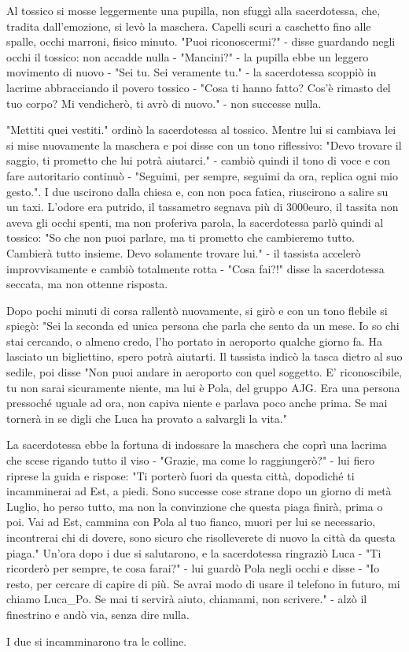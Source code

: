 Al tossico si mosse leggermente una pupilla, non sfuggì alla sacerdotessa, che, tradita dall'emozione, si levò la maschera. Capelli scuri a caschetto fino alle spalle, occhi marroni, fisico minuto.
"Puoi riconoscermi?" - disse guardando negli occhi il tossico: non accadde nulla - "Mancini?" - la pupilla ebbe un leggero movimento di nuovo - "Sei tu. Sei veramente tu." - la sacerdotessa scoppiò in lacrime abbracciando il povero tossico - "Cosa ti hanno fatto? Cos'è rimasto del tuo corpo? Mi vendicherò, ti avrò di nuovo." - non successe nulla.

"Mettiti quei vestiti." ordinò la sacerdotessa al tossico. Mentre lui si cambiava lei si mise nuovamente la maschera e poi disse con un tono riflessivo: "Devo trovare il saggio, ti prometto che lui potrà aiutarci." - cambiò quindi il tono di voce e con fare autoritario continuò - "Seguimi, per sempre, seguimi da ora, replica ogni mio gesto.". 
I due uscirono dalla chiesa e, con non poca fatica, riuscirono a salire su un taxi. L'odore era putrido, il tassametro segnava più di 3000euro, il tassita non aveva gli occhi spenti, ma non proferiva parola, la sacerdotessa parlò quindi al tossico: "So che non puoi parlare, ma ti prometto che cambieremo tutto. Cambierà tutto insieme. Devo solamente trovare lui." - il tassista accelerò improvvisamente e cambiò totalmente rotta - "Cosa fai?!" disse la sacerdotessa seccata, ma non ottenne risposta.

Dopo pochi minuti di corsa rallentò nuovamente, si girò e con un tono flebile si spiegò: "Sei la seconda ed unica persona che parla che sento da un mese. Io so chi stai cercando, o almeno credo, l'ho portato in aeroporto qualche giorno fa. Ha lasciato un bigliettino, spero potrà aiutarti. Il tassista indicò la tasca dietro al suo sedile, poi disse "Non puoi andare in aeroporto con quel soggetto. E' riconoscibile, tu non sarai sicuramente niente, ma lui è Pola, del gruppo AJG. Era una persona pressoché uguale ad ora, non capiva niente e parlava poco anche prima. Se mai tornerà in se digli che Luca ha provato a salvargli la vita."

La sacerdotessa ebbe la fortuna di indossare la maschera che coprì una lacrima che scese rigando tutto il viso - "Grazie, ma come lo raggiungerò?" - lui fiero riprese la guida e rispose: "Ti porterò fuori da questa città, dopodiché ti incamminerai ad Est, a piedi. Sono successe cose strane dopo un giorno di metà Luglio, ho perso tutto, ma non la convinzione che questa piaga finirà, prima o poi. Vai ad Est, cammina con Pola al tuo fianco, muori per lui se necessario, incontrerai chi di dovere, sono sicuro che risolleverete di nuovo la città da questa piaga."
Un'ora dopo i due si salutarono, e la sacerdotessa ringraziò Luca - "Ti ricorderò per sempre, te cosa farai?" - lui guardò Pola negli occhi e disse - "Io resto, per cercare di capire di più. Se avrai modo di usare il telefono in futuro, mi chiamo Luca\_Po. Se mai ti servirà aiuto, chiamami, non scrivere." - alzò il finestrino e andò via, senza dire nulla.

I due si incamminarono tra le colline.

